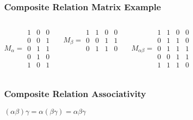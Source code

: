 \documentclass[dvipsnames]{beamer}
\begin{document}
\begin{frame}
  \frametitle{Composite Relation Matrix Example}

  \begin{example}
    \begin{columns}
      \[ M_\alpha =
         \begin{array}{|ccc|}
           1 & 0 & 0\\
           0 & 0 & 1\\
           0 & 1 & 1\\
           0 & 1 & 0\\
           1 & 0 & 1
         \end{array}
      \]

      \[ M_\beta =
         \begin{array}{|cccc|}
           1 & 1 & 0 & 0\\
           0 & 0 & 1 & 1\\
           0 & 1 & 1 & 0
         \end{array}
      \]

      \[ M_{\alpha \beta} =
         \begin{array}{|cccc|}
           1 & 1 & 0 & 0\\
           0 & 1 & 1 & 0\\
           0 & 1 & 1 & 1\\
           0 & 0 & 1 & 1\\
           1 & 1 & 1 & 0
        \end{array}
      \]
    \end{columns}
  \end{example}
\end{frame}

\begin{frame}
  \frametitle{Composite Relation Associativity}

  \begin{theorem}
      $(\alpha \beta) \gamma = \alpha (\beta \gamma) = \alpha \beta \gamma$
  \end{theorem}
\end{frame}
\end{document}
